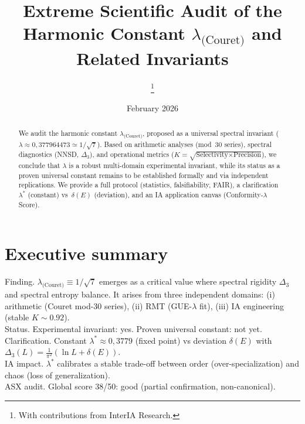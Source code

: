 \documentclass[11pt,a4paper]{article}
\def\lambda{λ}%
\def\Delta{Δ}%
\def\textbf#1{#1}%
\def\emph#1{#1}%
\begin{document}



\title{\LARGE Extreme Scientific Audit of the Harmonic Constant
\texorpdfstring{$\lambda_{\text{(Couret)}}$}{lambda(Couret)} and Related Invariants}
\author{\InterIAauthors\thanks{With contributions from \emph{InterIA Research}.}}
\date{February 2026}
\maketitle

\tableofcontents

\begin{abstract}
We audit the harmonic constant $\lambda_{\text{(Couret)}}$, proposed as a universal spectral invariant ($\lambda \approx 0{,}377964473 \simeq 1/\sqrt{7}$).
Based on arithmetic analyses (mod~30 series), spectral diagnostics (NNSD, $\Delta_3$), and operational metrics ($K=\sqrt{\text{Selectivity}\times\text{Precision}}$), we conclude that $\lambda$ is a \textbf{robust multi-domain experimental invariant}, while its status as a \textbf{proven universal constant} remains to be established formally and via independent replications.
We provide a full protocol (statistics, falsifiability, FAIR), a clarification $\lambda^\ast$ (constant) vs~$\delta(E)$ (deviation), and an IA application canvas (Conformity-$\lambda$ Score).
\end{abstract}

\section*{Executive summary} %
\textbf{Finding.} $\lambda_{\text{(Couret)}} \equiv 1/\sqrt{7}$ emerges as a critical value where spectral rigidity $\Delta_3$ and spectral entropy balance. It arises from three independent domains: (i) \emph{arithmetic} (Couret mod-30 series), (ii) \emph{RMT} (GUE-$\lambda$ fit), (iii) \emph{IA engineering} (stable $K\sim 0.92$). \\
\textbf{Status.} Experimental invariant: \textbf{yes}. Proven universal constant: \textbf{not yet}. \\
\textbf{Clarification.} \emph{Constant} $\lambda^\ast \approx 0{,}3779$ (fixed point) vs \emph{deviation} $\delta(E)$ with $\Delta_3(L)=\frac{1}{\pi^2}(\ln L + \delta(E))$. \\
\textbf{IA impact.} $\lambda^\ast$ calibrates a stable trade-off between order (over-specialization) and chaos (loss of generalization). \\
\textbf{ASX audit.} Global score 38/50: \emph{good} (partial confirmation, non-canonical).
\end{document}
